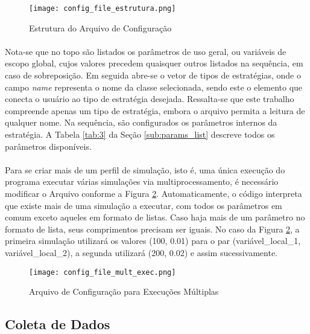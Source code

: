 \begin{figure}[!htb]
    \texttt{[image: config\_file\_estrutura.png]}
    \centering
    \caption{Estrutura do Arquivo de Configuração}
    \label{fig:101}
\end{figure}

\paragraph{} Nota-se que no topo são listados os parâmetros de uso geral, ou variáveis de escopo global, cujos valores precedem quaisquer outros listados na sequência, em caso de sobreposição. Em seguida abre-se o vetor de tipos de estratégias, onde o campo \textit{name} representa o nome da classe selecionada, sendo este o elemento que conecta o usuário ao tipo de estratégia desejada. Ressalta-se que este trabalho compreende apenas um tipo de estratégia, embora o arquivo permita a leitura de qualquer nome. Na sequência, são configurados os parâmetros internos da estratégia. A Tabela \ref{tab:3} da Seção \ref{sub:params_list} descreve todos os parâmetros disponíveis.

\paragraph{} Para se criar mais de um perfil de simulação, isto é, uma única execução do programa executar várias simulações via multiprocessamento, é necessário modificar o Arquivo conforme a Figura \ref{fig:102}. Automaticamente, o código interpreta que existe mais de uma simulação a executar, com todos os parâmetros em comum exceto aqueles em formato de listas. Caso haja mais de um parâmetro no formato de lista, seus comprimentos precisam ser iguais. No caso da Figura \ref{fig:102}, a primeira simulação utilizará os valores (100, 0.01) para o par (variável\_local\_1, variável\_local\_2), a segunda utilizará (200, 0.02) e assim sucessivamente.

\begin{figure}[!htb]
    \texttt{[image: config\_file\_mult\_exec.png]}
    \centering
    \caption{Arquivo de Configuração para Execuções Múltiplas}
    \label{fig:102}
\end{figure}



\FloatBarrier
\subsection{Coleta de Dados}
\label{coleta_de_dados}

